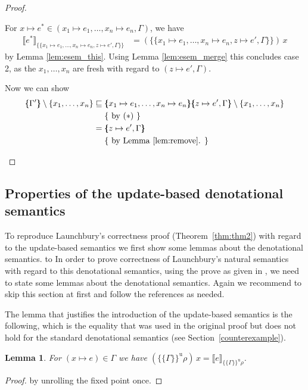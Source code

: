 \documentclass{scrartcl}
\newtheorem{lemma}{Lemma}
\theoremstyle{nonumberbreak}
\newtheorem{proof}{Proof}
\newcommand{\xen}{x_1\mapsto e_1, \ldots, x_n\mapsto e_n}
\newcommand{\dsem}[2]{\llbracket #1 \rrbracket_{#2}}
\newcommand{\esem}[1]{\{\!\!\!\{#1\}\!\!\!\}}
\newcommand{\esemu}[1]{\{\!\!\!\{#1\}\!\!\!\}^{\text{u}}}
\newcommand{\aexpl}[1]{&\mathrel{\phantom{=}}\left\{\text{ #1 }\right\}}
\begin{document}
\begin{proof}
\begin{compactitem}[$\sqsubseteq$:]
\begin{compactenum}
\item For $x \mapsto e^* \in (\xen, \Gamma)$, we have
\begin{align*}
\dsem{e^*}{\esem{\xen, z \mapsto e', \Gamma}}
&= (\esem{\xen, z \mapsto e', \Gamma})\, x
\end{align*}
by Lemma \ref{lem:esem_this}. Using Lemma \ref{lem:esem_merge} this concludes case 2, as the $x_1,\ldots,x_n$ are fresh with regard to $(z\mapsto e', \Gamma)$.
\end{compactenum}

Now we can show
\begin{align*}
\esem{\Gamma'} \setminus \{x_1,\ldots,x_n\}
&\sqsubseteq  \esem{\xen}{\esem{z \mapsto e', \Gamma}}  \setminus \{x_1,\ldots,x_n\} \\
\aexpl{by ($\ast$)} \\
& = {\esem{z \mapsto e', \Gamma}} \\
\aexpl{by Lemma \ref{lem:remove}.}
\end{align*}
\end{compactitem}

\end{proof}

\subsection{Properties of the update-based denotational semantics}
\label{updsemanticsprops}

To reproduce Launchbury's correctness proof (Theorem~\ref{thm:thm2}) with regard to the update-based semantics we first show some lemmas about the denotational semantics.
to 
In order to prove correctness of Launchbury's natural semantics with regard to this denotational semantics, using the prove as given in \cite{launchbury}, we need to state some lemmas about the denotational semantics. Again we recommend to skip this section at first and follow the references as needed.

The lemma that justifies the introduction of the update-based semantics is the following, which is the equality that was used in the original proof but does not hold for the standard denotational semantics (see Section~\ref{counterexample}).

\begin{lemma}
\label{lem:esemu_this}
For $(x\mapsto e)\in \Gamma$ we have $(\esemu{\Gamma}\rho)\,x = \dsem{e}{\esemu{\Gamma}\rho}$.
\end{lemma}

\begin{proof}
by unrolling the fixed point once.
\end{proof}
\end{document}
